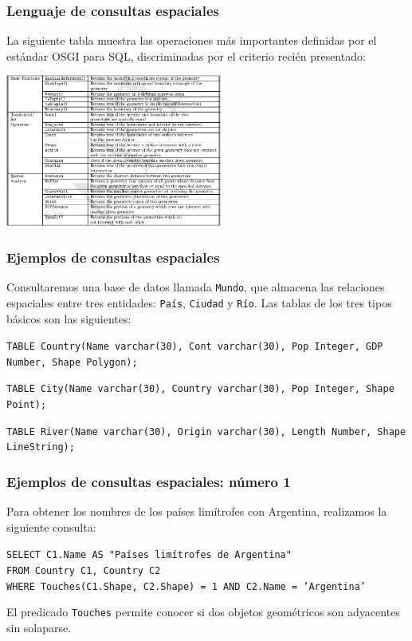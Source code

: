 \begin{frame}
\frametitle{Lenguaje de consultas espaciales}
	La siguiente tabla muestra las operaciones más importantes definidas
	por el estándar OSGI para SQL, discriminadas por el criterio recién
	presentado: \\

	\begin{center}
	\includegraphics[height=5cm]{tablaOGIS.png}
	\end{center}
\end{frame}

\begin{frame}
	\frametitle{Ejemplos de consultas espaciales}

	Consultaremos una base de datos llamada \texttt{Mundo}, que almacena
	las relaciones espaciales entre tres entidades: \texttt{País},
	\texttt{Ciudad} y \texttt{Río}. Las tablas de los tres tipos básicos
	son las siguientes: \pause

	\medskip

	\texttt{TABLE Country(Name varchar(30), Cont varchar(30), Pop Integer,
		GDP Number, Shape Polygon);}

	\medskip

	\texttt{TABLE City(Name varchar(30), Country varchar(30), Pop Integer,
		Shape Point);}

	\medskip

	\texttt{TABLE River(Name varchar(30), Origin varchar(30), Length Number,
		Shape LineString);}
\end{frame}

\begin{frame}
\frametitle{Ejemplos de consultas espaciales: número 1}
	Para obtener los nombres de los países limítrofes con Argentina,
	realizamos la siguiente consulta:

	\medskip
	\pause

	\texttt{SELECT C1.Name AS "Países limítrofes de Argentina" \\
			FROM Country C1, Country C2 \\
			WHERE Touches(C1.Shape, C2.Shape) = 1 AND C2.Name = 'Argentina'
	}

	\medskip
	\pause

	El predicado \texttt{Touches} permite conocer si dos objetos geométricos
	son adyacentes sin solaparse.
\end{frame}

